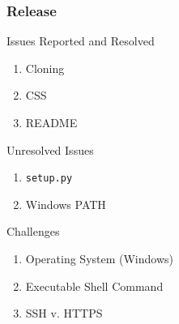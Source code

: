 \begin{frame}
	\centering
	\frametitle{Release}

	\begin{block}{Issues Reported and Resolved}
		\begin{enumerate}
			\item Cloning
			\item CSS
			\item README
		\end{enumerate}
	\end{block}

	\pause

	\begin{block}{Unresolved Issues}
		\begin{enumerate}
      \item \texttt{setup.py}
      \item Windows PATH
		\end{enumerate}
	\end{block}

	\pause

	\begin{block}{Challenges}
		\begin{enumerate}
      \item Operating System (Windows)
			\item Executable Shell Command
			\item SSH v. HTTPS
		\end{enumerate}
	\end{block}

\end{frame}
